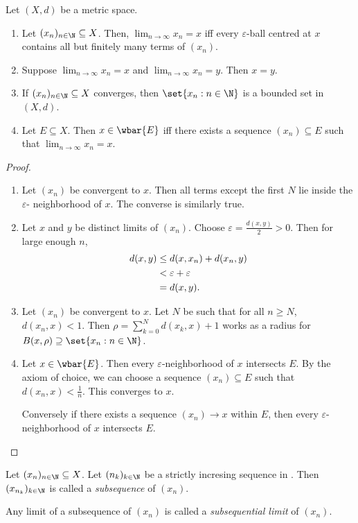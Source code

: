 \begin{theorem}
    Let $(X, d)$ be a metric space.
    \begin{enumerate}
        \item Let $(x_n)_{n \in \N} \subseteq X$.
        Then, $\lim_{n \to \infty} x_n = x$ iff every $\varepsilon$-ball
        centred at $x$ contains all but finitely many terms of $(x_n)$.
        \item Suppose $\lim_{n \to \infty} x_n = x$ and
        $\lim_{n \to \infty} x_n = y$. Then $x = y$.
        \item If $(x_n)_{n \in \N} \subseteq X$ converges, then
        $\set{x_n : n \in \N}$ is a bounded set in $(X, d)$.
        \item Let $E \subseteq X$.
        Then $x \in \wbar{E}$ iff there exists a sequence $(x_n)\subseteq E$
        such that $\lim_{n \to \infty} x_n = x$.
    \end{enumerate}
\end{theorem}
\begin{proof} \leavevmode
    \begin{enumerate}
        \item Let $(x_n)$ be convergent to $x$.
        Then all terms except the first $N$ lie inside the $\varepsilon$-
        neighborhood of $x$.
        The converse is similarly true.
        \item Let $x$ and $y$ be distinct limits of $(x_n)$.
        Choose $\varepsilon = \frac{d(x, y)}{2} > 0$.
        Then for large enough $n$, \begin{align*}
            d(x, y) &\le d(x, x_n) + d(x_n, y) \\
            &< \varepsilon + \varepsilon \\
            &= d(x, y). \qedhere
        \end{align*}
        \item Let $(x_n)$ be convergent to $x$.
        Let $N$ be such that for all $n \ge N$, $d(x_n, x) < 1$.
        Then $\rho = \sum_{k=0}^{N} d(x_k, x) + 1$ works as a radius for
        $B(x, \rho) \supseteq \set{x_n : n \in \N}$.
        \item Let $x \in \wbar{E}$.
        Then every $\varepsilon$-neighborhood of $x$ intersects $E$.
        By the axiom of choice, we can choose a sequence $(x_n) \subseteq E$
        such that $d(x_n, x) < \frac1n$.
        This converges to $x$.

        Conversely if there exists a sequence $(x_n) \to x$ within $E$, then
        every $\varepsilon$-neighborhood of $x$ intersects $E$.
    \end{enumerate}
\end{proof}

\begin{definition}
    Let $(x_n)_{n \in \N} \subseteq X$.
    Let $(n_k)_{k \in \N}$ be a strictly incresing sequence in \N.
    Then $(x_{n_k})_{k \in \N}$ is called a \emph{subsequence} of $(x_n)$.

    Any limit of a subsequence of $(x_n)$ is called a \emph{subsequential
    limit} of $(x_n)$.
\end{definition}
